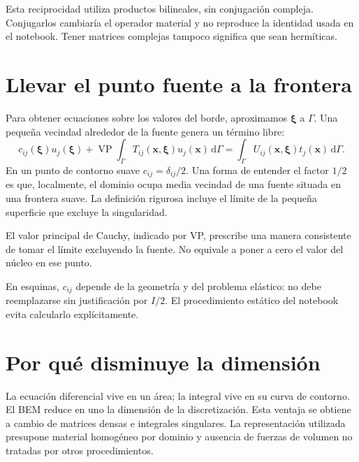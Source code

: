 \documentclass[11pt,a4paper]{report}
\numberwithin{equation}{chapter}
\newcommand{\vect}[1]{\bm{#1}}
\newcommand{\dd}{\,\mathrm{d}}
\newcommand{\VP}{\operatorname{VP}}
\begin{document}
\begin{cuidado}
Esta reciprocidad utiliza productos bilineales, sin conjugaci\'on compleja.
Conjugarlos cambiar\'ia el operador material y no reproduce la identidad
usada en el notebook. Tener matrices complejas tampoco significa que sean
herm\'iticas.
\end{cuidado}

\section{Llevar el punto fuente a la frontera}
Para obtener ecuaciones sobre los valores del borde, aproximamos
$\vect\xi$ a $\Gamma$. Una peque\~na vecindad alrededor de la fuente
genera un t\'ermino libre:
\begin{equation}
 c_{ij}(\vect\xi)u_j(\vect\xi)+
 \VP\int_\Gamma T_{ij}(\vect x,\vect\xi)u_j(\vect x)\dd\Gamma
 =
 \int_\Gamma U_{ij}(\vect x,\vect\xi)t_j(\vect x)\dd\Gamma.
 \label{eq:BIE}
\end{equation}
En un punto de contorno suave $c_{ij}=\delta_{ij}/2$.
Una forma de entender el factor $1/2$ es que, localmente, el dominio
ocupa media vecindad de una fuente situada en una frontera suave.
La definici\'on rigurosa incluye el l\'imite de la peque\~na superficie
que excluye la singularidad.

El valor principal de Cauchy, indicado por VP, prescribe una manera
consistente de tomar el l\'imite excluyendo la fuente. No equivale a
poner a cero el valor del n\'ucleo en ese punto.

En esquinas, $c_{ij}$ depende de la geometr\'ia y del problema el\'astico:
no debe reemplazarse sin justificaci\'on por $I/2$. El procedimiento
est\'atico del notebook evita calcularlo expl\'icitamente.

\section{Por qu\'e disminuye la dimensi\'on}
La ecuaci\'on diferencial vive en un \'area; la integral vive en su curva
de contorno. El BEM reduce en uno la dimensi\'on de la discretizaci\'on.
Esta ventaja se obtiene a cambio de matrices densas e integrales singulares.
La representaci\'on utilizada presupone material homog\'eneo por dominio
y ausencia de fuerzas de volumen no tratadas por otros procedimientos.
\end{document}
